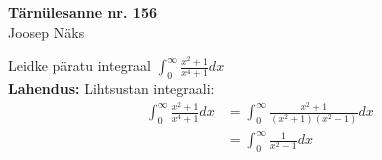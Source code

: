 \documentclass{article}
\begin{document}
\begin{center}
\Large\textbf{T\"arn\"ulesanne nr. 156}\\
\small{Joosep N\"aks}
\end{center}
Leidke p\"aratu integraal $\displaystyle\int_0^\infty\frac{x^2+1}{x^4+1}dx$\\
\textbf{Lahendus:} Lihtsustan integraali:
\begin{equation*}
\begin{aligned}
\int_0^\infty\frac{x^2+1}{x^4+1}dx&=\int_0^\infty\frac{x^2+1}{(x^2+1)(x^2-1)}dx\\
&=\int_0^\infty\frac{1}{x^2-1}dx
\end{aligned}
\end{equation*}
\end{document}
